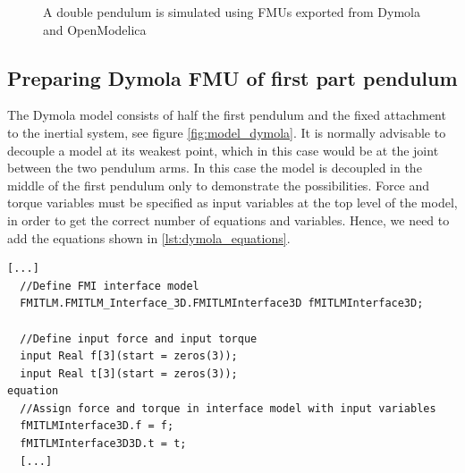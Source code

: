 \documentclass[11pt,a4paper,english]{report}
\begin{document}
\begin{figure}[ht]
\centering
{}
\caption{A double pendulum is simulated using FMUs exported from Dymola and OpenModelica}
\label{fig:double_pendulum}
\end{figure}

\subsection{Preparing Dymola FMU of first part pendulum}

The Dymola model consists of half the first pendulum and the fixed attachment to the inertial system, see figure \cref{fig:model_dymola}.
It is normally advisable to decouple a model at its weakest point, which in this case would be at the joint between the two pendulum arms.
In this case the model is decoupled in the middle of the first pendulum only to demonstrate the possibilities.
Force and torque variables must be specified as input variables at the top level of the model, in order to get the correct number of equations and variables.
Hence, we need to add the equations shown in \cref{lst:dymola_equations}.

\begin{lstlisting}[language=Modelica,basicstyle=\small\ttfamily, floatplacement=ht,label=lst:dymola_equations,caption=Input variables must be specified on top level in the Modelica models]
  [...]
  //Define FMI interface model
  FMITLM.FMITLM_Interface_3D.FMITLMInterface3D fMITLMInterface3D;
  
  //Define input force and input torque
  input Real f[3](start = zeros(3));
  input Real t[3](start = zeros(3));
equation
  //Assign force and torque in interface model with input variables
  fMITLMInterface3D.f = f;
  fMITLMInterface3D3D.t = t;
  [...]
\end{lstlisting}
\end{document}
